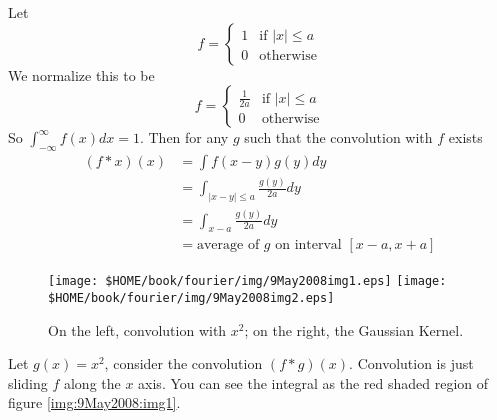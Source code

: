 \begin{ex}
Let
\begin{equation}
f = \begin{cases}1&\text{if }|x|\leq a\\
0&\text{otherwise}\end{cases}
\end{equation}
We normalize this to be
\begin{equation}
f = \begin{cases}\frac{1}{2a}&\text{if }|x|\leq a\\
0&\text{otherwise}\end{cases}
\end{equation}
So $\int^{\infty}_{-\infty}f(x)dx = 1$. Then for any $g$
such that the convolution with $f$ exists
\begin{subequations}
\begin{align}
(f*x)(x) &= \int f(x-y)g(y)dy\\
&= \int_{|x-y|\leq a} \frac{g(y)}{2a}dy\\
&= \int_{x-a} \frac{g(y)}{2a}dy\\
&=\text{average of $g$ on interval $[x-a,x+a]$}
\end{align}
\end{subequations}
\end{ex}


\begin{figure}[h!]
\texttt{[image: \$HOME/book/fourier/img/9May2008img1.eps]}
\texttt{[image: \$HOME/book/fourier/img/9May2008img2.eps]}
\caption{On the left, convolution with $x^2$; on the right, the Gaussian Kernel.}\label{img:9May2008:img1}\label{img:9May2008:img2}
\end{figure}


\begin{ex}
Let $g(x)=x^2$, consider the convolution
$(f*g)(x)$. Convolution is just sliding $f$ along the $x$ 
axis. You can see the integral as the red shaded region of
figure \eqref{img:9May2008:img1}.
\end{ex}

